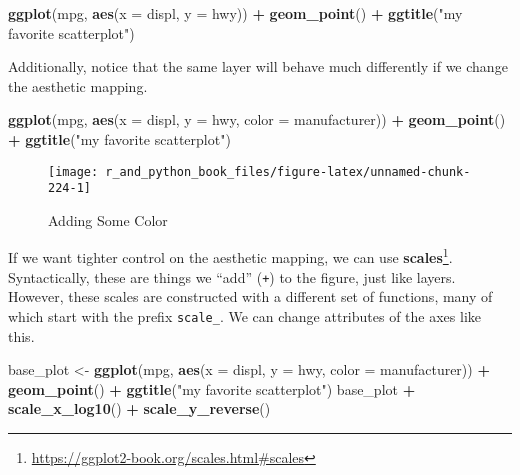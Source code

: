 \documentclass[12pt,krantz2]{krantz}
\makeatletter
\newenvironment{Shaded}{\begin{snugshade}}{\end{snugshade}}
\newcommand{\DataTypeTok}[1]{\textcolor[rgb]{0.27,0.27,0.27}{#1}}
\newcommand{\KeywordTok}[1]{\textcolor[rgb]{0.27,0.27,0.27}{\textbf{#1}}}
\newcommand{\NormalTok}[1]{#1}
\newcommand{\OperatorTok}[1]{\textcolor[rgb]{0.43,0.43,0.43}{\textbf{#1}}}
\newcommand{\StringTok}[1]{\textcolor[rgb]{0.5,0.5,0.5}{#1}}
\renewcommand{\href}[2]{#2\footnote{\url{#1}}}
\newenvironment{kframe}{%
\medskip{}
\setlength{\fboxsep}{.8em}
 \def\at@end@of@kframe{}%
 \ifinner\ifhmode%
  \def\at@end@of@kframe{\end{minipage}}%
  \begin{minipage}{\columnwidth}%
 \fi\fi%
 \def\FrameCommand##1{\hskip\@totalleftmargin \hskip-\fboxsep
 \colorbox{shadecolor}{##1}\hskip-\fboxsep
     \hskip-\linewidth \hskip-\@totalleftmargin \hskip\columnwidth}%
 \MakeFramed {\advance\hsize-\width
   \@totalleftmargin\z@ \linewidth\hsize
   \@setminipage}}%
 {\par\unskip\endMakeFramed%
 \at@end@of@kframe}
\renewenvironment{Shaded}{\begin{kframe}}{\end{kframe}}
\makeatother
\begin{document}
\begin{Shaded}
\begin{Highlighting}[]
\KeywordTok{ggplot}\NormalTok{(mpg, }\KeywordTok{aes}\NormalTok{(}\DataTypeTok{x =}\NormalTok{ displ, }\DataTypeTok{y =}\NormalTok{ hwy))  }\OperatorTok{+}
\StringTok{  }\KeywordTok{geom_point}\NormalTok{() }\OperatorTok{+}\StringTok{ }
\StringTok{  }\KeywordTok{ggtitle}\NormalTok{(}\StringTok{"my favorite scatterplot"}\NormalTok{)}
\end{Highlighting}
\end{Shaded}

Additionally, notice that the same layer will behave much differently if we change the aesthetic mapping.

\begin{Shaded}
\begin{Highlighting}[]
\KeywordTok{ggplot}\NormalTok{(mpg, }\KeywordTok{aes}\NormalTok{(}\DataTypeTok{x =}\NormalTok{ displ, }\DataTypeTok{y =}\NormalTok{ hwy, }\DataTypeTok{color =}\NormalTok{ manufacturer))  }\OperatorTok{+}
\StringTok{  }\KeywordTok{geom_point}\NormalTok{() }\OperatorTok{+}\StringTok{ }
\StringTok{  }\KeywordTok{ggtitle}\NormalTok{(}\StringTok{"my favorite scatterplot"}\NormalTok{)}
\end{Highlighting}
\end{Shaded}

\begin{figure}

{\centering \texttt{[image: r\_and\_python\_book\_files/figure-latex/unnamed-chunk-224-1]} 

}

\caption{Adding Some Color}\label{fig:unnamed-chunk-224}
\end{figure}

If we want tighter control on the aesthetic mapping, we can use \href{https://ggplot2-book.org/scales.html\#scales}{\textbf{scales}}. Syntactically, these are things we ``add'' (\texttt{+}) to the figure, just like layers. However, these scales are constructed with a different set of functions, many of which start with the prefix \texttt{scale\_}. We can change attributes of the axes like this.

\begin{Shaded}
\begin{Highlighting}[]
\NormalTok{base_plot <-}\StringTok{ }\KeywordTok{ggplot}\NormalTok{(mpg, }
                    \KeywordTok{aes}\NormalTok{(}\DataTypeTok{x =}\NormalTok{ displ, }\DataTypeTok{y =}\NormalTok{ hwy, }\DataTypeTok{color =}\NormalTok{ manufacturer)) }\OperatorTok{+}
\StringTok{             }\KeywordTok{geom_point}\NormalTok{() }\OperatorTok{+}\StringTok{ }
\StringTok{             }\KeywordTok{ggtitle}\NormalTok{(}\StringTok{"my favorite scatterplot"}\NormalTok{)}
\NormalTok{base_plot }\OperatorTok{+}\StringTok{ }\KeywordTok{scale_x_log10}\NormalTok{() }\OperatorTok{+}\StringTok{ }\KeywordTok{scale_y_reverse}\NormalTok{()}
\end{Highlighting}
\end{Shaded}
\end{document}
